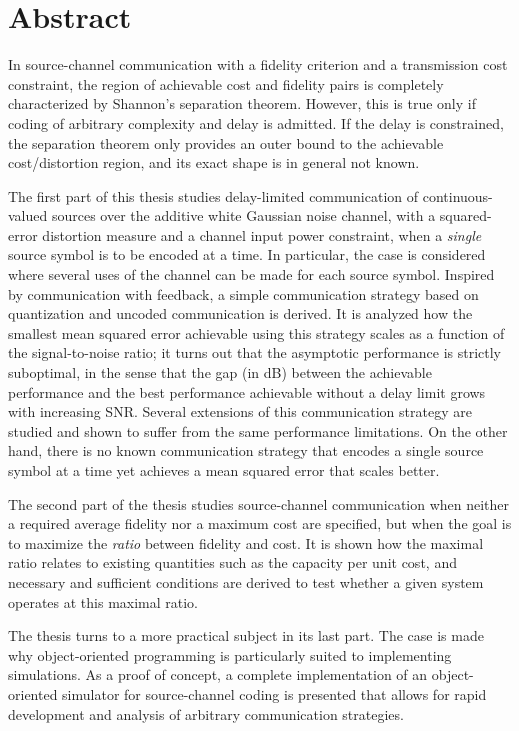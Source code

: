 \chapter*{Abstract}


In source-channel communication with a fidelity criterion and a transmission
cost constraint, the region of achievable cost and fidelity pairs is completely
characterized by Shannon's separation theorem. However, this is true only if
coding of arbitrary complexity and delay is admitted. If the delay is
constrained, the separation theorem only provides an outer bound to the
achievable cost/distortion region, and its exact shape is in general not known.

The first part of this thesis studies delay-limited communication of
continuous-valued sources over the additive white Gaussian noise channel, with a
squared-error distortion measure and a channel input power constraint, when a
\emph{single} source symbol is to be encoded at a time. In particular, the case
is considered where several uses of the channel can be made for each source
symbol. Inspired by communication with feedback, a simple communication strategy
based on quantization and uncoded communication is derived.  It is analyzed how
the smallest mean squared error achievable using this strategy scales as a
function of the signal-to-noise ratio; it turns out that the asymptotic
performance is strictly suboptimal, in the sense that the gap (in dB) between
the achievable performance and the best performance achievable without a delay
limit grows with increasing SNR. Several extensions of this communication
strategy are studied and shown to suffer from the same performance
limitations. On the other hand, there is no known communication strategy that
encodes a single source symbol at a time yet achieves a mean squared error that
scales better. 

The second part of the thesis studies source-channel communication when neither
a required average fidelity nor a maximum cost are specified, but when the goal
is to maximize the \emph{ratio} between fidelity and cost. It is shown how the
maximal ratio relates to existing quantities such as the capacity per unit cost,
and necessary and sufficient conditions are derived to test whether a given
system operates at this maximal ratio. 

The thesis turns to a more practical subject in its last part. The case is made
why object-oriented programming is particularly suited to implementing
simulations. As a proof of concept, a complete implementation of an
object-oriented simulator for source-channel coding is presented that allows for
rapid development and analysis of arbitrary communication strategies.

